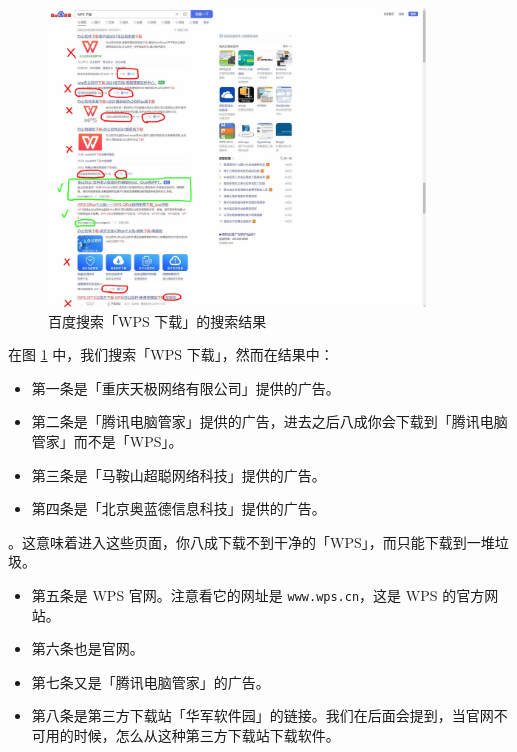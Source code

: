 \begin{figure}[htb!]
  \centering
  \includegraphics[width=10cm]{assets/Baidu_result.jpg}
  \caption{百度搜索「WPS 下载」的搜索结果}
  \label{baidu-wps-result}
\end{figure}

在图 \ref{baidu-wps-result} 中，我们搜索「WPS 下载」，然而在结果中：

\begin{itemize}
  \item {\color{Brown1} 第一条是「重庆天极网络有限公司」提供的广告。}
  \item {\color{Brown1} 第二条是「腾讯电脑管家」提供的广告，进去之后八成你会下载到「腾讯电脑管家」而不是「WPS」。}
  \item {\color{Brown1} 第三条是「马鞍山超聪网络科技」提供的广告。}
  \item {\color{Brown1} 第四条是「北京奥蓝德信息科技」提供的广告。}
\end{itemize}

。这意味着进入这些页面，你八成下载不到干净的「WPS」，而只能下载到一堆垃圾。

\begin{itemize}
  \item {\color{Chartreuse3} 第五条是 WPS 官网。注意看它的网址是 \texttt{www.wps.cn}，这是 WPS 的官方网站。}
  \item {\color{Chartreuse3} 第六条也是官网。}
  \item {\color{Brown1} 第七条又是「腾讯电脑管家」的广告。}
  \item {\color{DarkGoldenrod2} 第八条是第三方下载站「华军软件园」的链接。我们在后面会提到，当官网不可用的时候，怎么从这种第三方下载站下载软件。}
\end{itemize}

